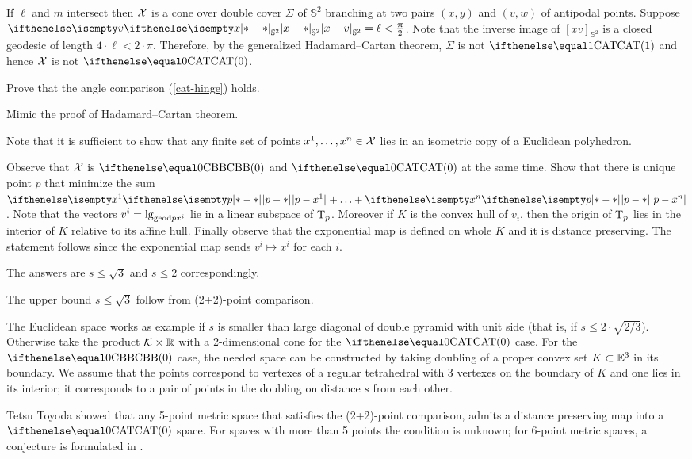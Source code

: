 If $\ell$ and $m$ intersect then $\mathcal{X}$ is a cone over double cover $\Sigma$ of $\mathbb{S}^2$ branching at two pairs $(x,y)$ and $(v,w)$ of antipodal points.
Suppose $\dist{x}{v}{\mathbb{S}^2}=\ell<\tfrac\pi2$.
Note that the inverse image of $[xv]_{\mathbb{S}^2}$ is a closed geodesic of length $4\cdot\ell<2\cdot\pi$.
Therefore, by the generalized Hadamard--Cartan theorem, $\Sigma$ is not $\CAT1$ and hence $\mathcal{X}$ is not $\CAT0$.

 Prove that the angle comparison (\ref{cat-hinge}) holds.

 Mimic the proof of Hadamard--Cartan theorem.

Note that it is sufficient to show that any finite set of points $x^1,\dots,x^n\in\spc{X}$ lies in an isometric copy of a Euclidean polyhedron.

Observe that $\mathcal{X}$ is $\Alex0$ and $\CAT0$ at the same time.
Show that there is unique point $p$ that minimize the sum $\dist{p}{x^1}{}+\dots+\dist{p}{x^n}{}$.
Note that the vectors $v^i=\lg_{\mathrm{geod}{p}{x^i}}$ lie in a linear subspace of $\text{\rm T}_p$.
Moreover if $K$ is the convex hull of $v_i$, then the origin of $\text{\rm T}_p$ lies in the interior of $K$ relative to its affine hull.
Finally observe that the exponential map is defined on whole $K$ and it is distance preserving.
The statement follows since the exponential map sends $v^i\mapsto x^i$ for each $i$.

The answers are $s\le \sqrt3$ and $s\le 2$ correspondingly.

The upper bound $s\le \sqrt3$ follow from (2+2)-point comparison.

The Euclidean space works as example if $s$ is smaller than large diagonal of double pyramid with unit side (that is, if $s\le 2\cdot\sqrt{2/3}$).
Otherwise take the product $\spc{K}\times \RR$ with a 2-dimensional cone for the $\CAT0$ case.
For the $\Alex0$ case, the needed space can be constructed by taking doubling of a proper convex set $K\subset\EE^3$ in its boundary.
We assume that the points correspond to vertexes of a regular tetrahedral with 3 vertexes on the boundary of $K$ and one lies in its interior; it corresponds to a pair of points in the doubling on distance $s$ from each other.

Tetsu Toyoda \cite{toyoda} showed that any 5-point metric space that satisfies the (2+2)-point comparison, admits a distance preserving map into a $\CAT0$ space.
For spaces with more than 5 points the condition is unknown;
for 6-point metric spaces, a conjecture is formulated in \cite{LPZ}.

